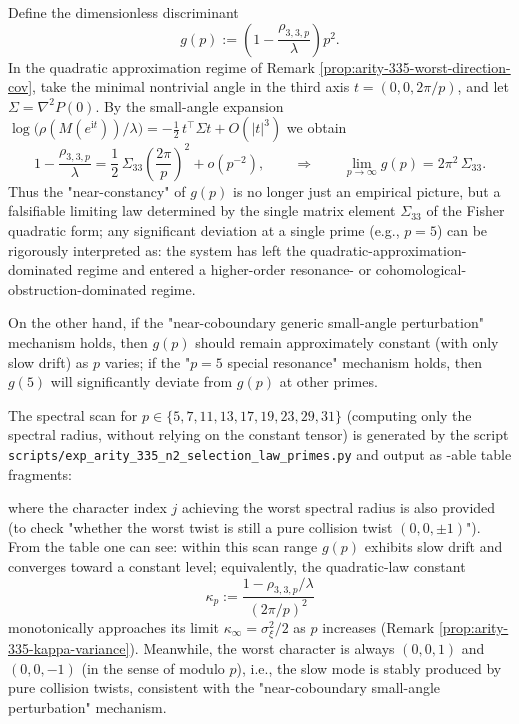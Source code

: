 \begin{remark}\label{rem:arity-335-selection-law-gp}
Define the dimensionless discriminant
\[
g(p):=\left(1-\frac{\rho_{3,3,p}}{\lambda}\right)p^2.
\]
In the quadratic approximation regime of Remark \ref{prop:arity-335-worst-direction-cov}, take the minimal nontrivial angle in the third axis
\(
t=(0,0,2\pi/p)
\), and let \(\Sigma=\nabla^2P(0)\).
By the small-angle expansion
\(
\log\bigl(\rho(M(e^{\mathrm{i}t}))/\lambda\bigr)=-\tfrac12\,t^\top\Sigma t+O(|t|^3)
\)
we obtain
\[
1-\frac{\rho_{3,3,p}}{\lambda}
=\frac12\,\Sigma_{33}\left(\frac{2\pi}{p}\right)^2+o(p^{-2}),
\qquad\Longrightarrow\qquad
\lim_{p\to\infty}g(p)=2\pi^2\,\Sigma_{33}.
\]
Thus the "near-constancy" of \(g(p)\) is no longer just an empirical picture, but a falsifiable limiting law determined by the single matrix element \(\Sigma_{33}\) of the Fisher quadratic form; any significant deviation at a single prime (e.g., \(p=5\)) can be rigorously interpreted as: the system has left the quadratic-approximation-dominated regime and entered a higher-order resonance- or cohomological-obstruction-dominated regime.
\par
On the other hand, if the "near-coboundary generic small-angle perturbation" mechanism holds, then \(g(p)\) should remain approximately constant (with only slow drift) as \(p\) varies; if the "\(p=5\) special resonance" mechanism holds, then \(g(5)\) will significantly deviate from \(g(p)\) at other primes.
\par
The spectral scan for \(p\in\{5,7,11,13,17,19,23,29,31\}\) (computing only the spectral radius, without relying on the constant tensor) is generated by the script
\texttt{scripts/exp\_arity\_335\_n2\_selection\_law\_primes.py}
and output as \verb||-able table fragments:

where the character index \(j\) achieving the worst spectral radius is also provided (to check "whether the worst twist is still a pure collision twist \((0,0,\pm1)\)").
From the table one can see: within this scan range \(g(p)\) exhibits slow drift and converges toward a constant level; equivalently, the quadratic-law constant
\[
\kappa_p:=\frac{1-\rho_{3,3,p}/\lambda}{(2\pi/p)^2}
\]
monotonically approaches its limit \(\kappa_\infty=\sigma_\xi^2/2\) as \(p\) increases (Remark \ref{prop:arity-335-kappa-variance}).
Meanwhile, the worst character is always \((0,0,1)\) and \((0,0,-1)\) (in the sense of modulo \(p\)), i.e., the slow mode is stably produced by pure collision twists, consistent with the "near-coboundary small-angle perturbation" mechanism.
\end{remark}
